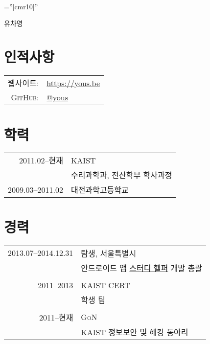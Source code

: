 \documentclass[a4paper,10pt]{article}
\begin{document}

\pagestyle{empty} %

\font\fb=''[cmr10]'' %

\par{\centering
{\Huge 유차영
}\bigskip\par}

\section{인적사항}

\begin{tabular}{rl}
  \textsc{웹사이트:}  & \url{https://yous.be} \\
  \textsc{GitHub:}    & \href{https://github.com/yous}{@yous} \\
\end{tabular}

\section{학력}
\begin{tabular}{rl}
  2011.02--현재 & KAIST \\
  & \textsc{수리과학과}, \textsc{전산학부} 학사과정 \\
  2009.03--2011.02 & 대전과학고등학교
\end{tabular}

\section{경력}
\begin{tabular}{r|p{11cm}}
  \textsc{2013.07--2014.12.31} & \textsc{탐생}, 서울특별시 \\
  & 안드로이드 앱 \href{https://play.google.com/store/apps/details?id=kr.co.tamseng.StudyHelper}{스터디 헬퍼} 개발 총괄 \\
  \multicolumn{2}{c}{} \\

  \textsc{2011--2013} & \textsc{KAIST CERT} \\
  & 학생 팀 \\
  \multicolumn{2}{c}{} \\

  \textsc{2011--현재} & \textsc{GoN} \\
  & KAIST 정보보안 및 해킹 동아리 \\
\end{tabular}
\end{document}
